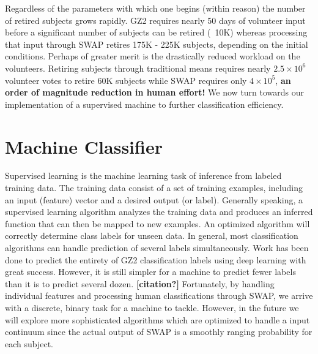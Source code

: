 \documentclass[twocolumn]{aastex6}
\begin{document}
Regardless of the parameters with which one begins (within reason) the number of 
retired subjects grows rapidly. GZ2 requires nearly 50 days of volunteer input before 
a significant number of subjects can be retired (~10K) whereas processing that input
through SWAP retires 175K - 225K subjects, depending on the initial conditions. 
Perhaps of greater merit is the drastically reduced workload on the volunteers. 
Retiring subjects through traditional means requires nearly $2.5\times10^6$ 
volunteer votes to retire 60K subjects while SWAP requires only $4\times10^5$, 
\textbf{an order of magnitude reduction in human effort!} We now turn towards
our implementation of a supervised machine to further classification efficiency. 


\section{Machine Classifier} \label{sec:machine}

Supervised learning is the machine learning task of inference from labeled 
training data. The training data consist of a set of training examples, including
an input (feature) vector and a desired output (or label).  Generally speaking,
a supervised learning algorithm analyzes the training data and produces an inferred 
function that can then be mapped to new examples. An optimized algorithm will 
correctly determine class labels for unseen data. In general, most classification 
algorithms can handle prediction of several labels simultaneously. Work has been
done to predict the entirety of GZ2 classification labels using deep learning 
\citep{Dieleman2015} with great success. However, it is still simpler for a machine
to predict fewer labels than it is to predict several dozen. \textbf{[citation?]} 
Fortunately, by handling individual features and processing human classifications
through SWAP, we arrive with a discrete, binary task for a machine to tackle.
However, in the future we will explore more sophisticated algorithms which 
are optimized to handle a input continuum since the actual output of SWAP
is a smoothly ranging probability for each subject. 
\end{document}
